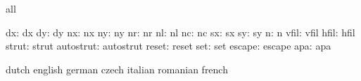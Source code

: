\stopvariables




\startconstants            all

                       dx: dx
                       dy: dy
                       nx: nx
                       ny: ny
                       nr: nr
                       nl: nl
                       nc: nc
                       sx: sx
                       sy: sy
                        n: n
                     vfil: vfil
                     hfil: hfil
                    strut: strut
                autostrut: autostrut
                    reset: reset
                      set: set
                   escape: escape
                      apa: apa

\stopconstants




\startvariables            dutch                     english
                           german                    czech
                           italian                   romanian
                           french

